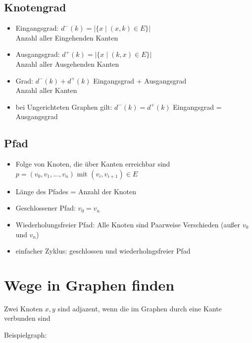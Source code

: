 \documentclass[a4paper,portrait]{scrartcl}
\begin{document}
\subsection{Knotengrad}
\begin{itemize}
\item Eingangsgrad: $d^{-}(k) = |\lbrace x \mid (x,k) \in E \rbrace|$\\
Anzahl aller Eingehenden Kanten
\item Ausgangsgrad: $d^{+}(k) = |\lbrace x \mid (k,x) \in E \rbrace|$\\
Anzahl aller Ausgehenden Kanten
\item Grad: $d^{-}(k) + d^{+}(k)$  Eingangsgrad + Ausgangsgrad\\
Anzahl aller Kanten
\item bei Ungerichteten Graphen gilt: $d^{-}(k) = d^{+}(k)$ Eingangsgrad = Ausgangsgrad
\end{itemize}
\subsection{Pfad}
\begin{itemize}
\item Folge von Knoten, die über Kanten erreichbar sind \\
$ p=(v_{0}, v_{1}, ..., v_{n}) $ mit $ (v_{i}, v_{i+1}) \in E $
\item Länge des Pfades = Anzahl der Knoten
\item Geschlossener Pfad: $ v_{0} = v_{n} $
\item Wiederholungsfreier Pfad: Alle Knoten sind Paarweise Verschieden (außer $ v_{0} $ und $ v_{n} $)
\item einfacher Zyklus: geschlossen und wiederholngsfreier Pfad
\end{itemize}
\section{Wege in Graphen finden}
Zwei Knoten $x,y$ sind adjazent, wenn die im Graphen durch eine Kante verbunden sind

Beispielgraph:
\end{document}
